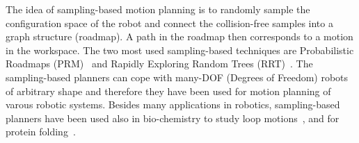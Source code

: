 \documentclass[usletter, 10pt, conference]{ieeeconf} %
\begin{document}
The idea of sampling-based motion planning is to randomly sample the configuration space of the robot and connect the collision-free samples
into a graph structure (roadmap).
A path in the roadmap then corresponds to a motion in the workspace.
The two most used sampling-based techniques are Probabilistic Roadmaps (PRM)~\cite{kavrakiForPP} and Rapidly Exploring Random Trees (RRT)~\cite{lavalleRRT}.
The sampling-based planners can cope with many-DOF (Degrees of Freedom) robots of arbitrary shape and therefore they have been used for motion planning of varous robotic systems.
Besides many applications in robotics, sampling-based planners have been used also in bio-chemistry 
to study loop motions~\cite{cortes2004geometric},
and for protein folding~\cite{raveh2009rapid,novinskaya2015improving}.
\end{document}
